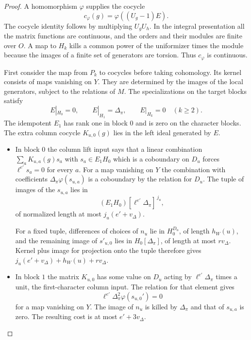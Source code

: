 \begin{proof}
A homomorphism \(\varphi\) supplies the cocycle
\[
    c_\varphi(g)=\varphi((U_g-1)E).
\]
The cocycle identity follows by multiplying \(U_g U_h\).
In the integral presentation all the matrix functions
are continuous, and the orders and their modules are
finite over \(O\). A map to \(H_k\) kills a common
power of the uniformizer times the module because the
images of a finite set of generators are torsion.
Thus \(c_\varphi\) is continuous.

First consider the map from \(P_k\) to cocycles before
taking cohomology. Its kernel consists of maps vanishing
on \(Y\). They are determined by the images of the local
generators, subject to the relations of \(M\).
The specializations on the target blocks satisfy
\[
 E|_{H_0}=0,\qquad E|_{H_1}=\Delta_\pi,\qquad E|_{H_k}=0\quad(k\ge2).
\]
The idempotent \(E_1\) has rank one
in block \(0\) and is zero on the character blocks.
The extra column cocycle \(K_{u,0}(g)\) lies in the
left ideal generated by \(E\).

\begin{itemize}
\item In block \(0\) the column lift input says that
a linear combination \(\sum_a K_{u,a}(g)s_a\) with
\(s_a\in E_1H_0\) which is a coboundary on \(D_u\)
forces \(\ell^{e'}s_a=0\) for every \(a\).
For a map vanishing on \(Y\) the combination with
coefficients \(\Delta_\pi\varphi(s_{u,a})\) is a
coboundary by the relation for \(D_u\). The tuple of images of the \(s_{u,a}\) lies in
\[
   (E_1 H_0)[\ell^{e'}\Delta_\pi]^{\,j_u},
\]
of normalized length at most \(j_u(e'+v_\Delta)\).

For a fixed tuple, differences of choices of \(n_u\) lie in
\(H_0^{D_u}\), of length \(h_W(u)\), and the remaining
image of \(s'_{u,0}\) lies in \(H_0[\Delta_\pi]\), of length
at most \(rv_\Delta\). Kernel plus image for projection onto
the tuple therefore gives
\(j_u(e'+v_\Delta)+h_W(u)+rv_\Delta\).

\item In block \(1\) the matrix \(K_{u,0}\) has some
value on \(D_u\) acting by
\(\ell^{e'}\Delta_\pi\) times a unit, the first-character
column input. The relation for that element gives
\[
 \ell^{e'}\Delta_\pi^2\varphi(s_{u,0}')=0
\]
for a
map vanishing on \(Y\). The image of \(n_u\) is killed
by \(\Delta_\pi\) and that of \(s_{u,a}\) is zero.
The resulting cost is at most \(e'+3v_\Delta\).


\end{itemize}
\end{proof}
